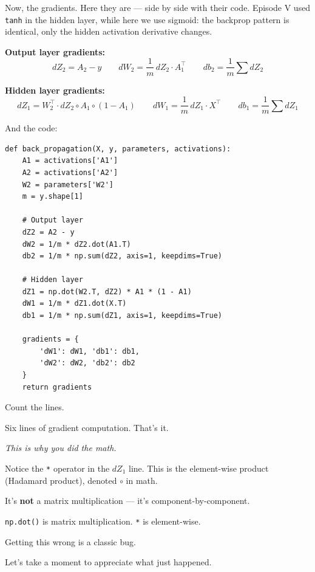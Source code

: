 \documentclass[11pt]{article}
\begin{document}
Now, the gradients. Here they are --- side by side with their code.
Episode V used \texttt{tanh} in the hidden layer, while here we use sigmoid:
the backprop pattern is identical, only the hidden activation derivative changes.

\begin{resultbox}[title=Episode V Equations $\to$ Python Code]

\textbf{Output layer gradients:}
\[
dZ_2 = A_2 - y \qquad dW_2 = \frac{1}{m} \, dZ_2 \cdot A_1^\top \qquad db_2 = \frac{1}{m} \sum dZ_2
\]

\textbf{Hidden layer gradients:}
\[
dZ_1 = W_2^\top \cdot dZ_2 \circ A_1 \circ (1 - A_1) \qquad dW_1 = \frac{1}{m} \, dZ_1 \cdot X^\top \qquad db_1 = \frac{1}{m} \sum dZ_1
\]
\end{resultbox}

And the code:

\begin{lstlisting}
def back_propagation(X, y, parameters, activations):
    A1 = activations['A1']
    A2 = activations['A2']
    W2 = parameters['W2']
    m = y.shape[1]

    # Output layer
    dZ2 = A2 - y
    dW2 = 1/m * dZ2.dot(A1.T)
    db2 = 1/m * np.sum(dZ2, axis=1, keepdims=True)

    # Hidden layer
    dZ1 = np.dot(W2.T, dZ2) * A1 * (1 - A1)
    dW1 = 1/m * dZ1.dot(X.T)
    db1 = 1/m * np.sum(dZ1, axis=1, keepdims=True)

    gradients = {
        'dW1': dW1, 'db1': db1,
        'dW2': dW2, 'db2': db2
    }
    return gradients
\end{lstlisting}

Count the lines.

Six lines of gradient computation. That's it.

\textit{This is why you did the math.}

\begin{warnbox}[title=The Hadamard Product]
Notice the \texttt{*} operator in the $dZ_1$ line. This is the element-wise product (Hadamard product), denoted $\circ$ in math.

It's \textbf{not} a matrix multiplication --- it's component-by-component.

\texttt{np.dot()} is matrix multiplication. \texttt{*} is element-wise.

Getting this wrong is a classic bug.
\end{warnbox}

Let's take a moment to appreciate what just happened.
\end{document}
